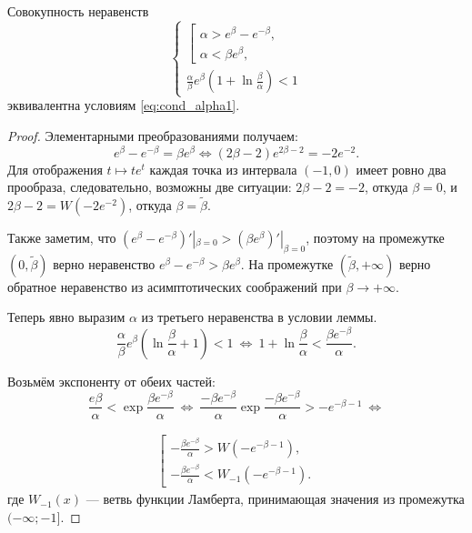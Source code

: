 \begin{lemma}
\label{lm:parameter_constraints:ch1}
Совокупность неравенств 
\[
\begin{cases}
\left[
\begin{array}{ll}
	\alpha > e^{\beta} - e^{-\beta},\\
    \alpha < \beta e^{\beta},
\end{array}
\right.\\
\frac{\alpha}{\beta}e^{\beta}\left(1 + \ln\frac{\beta}{\alpha}\right) < 1
\end{cases}
\]
эквивалентна условиям \eqref{eq:cond_alpha1}.
\end{lemma}
\begin{proof}
Элементарными преобразованиями получаем: 
\[
e^{\beta} - e^{-\beta} = \beta e^{\beta} \Leftrightarrow (2\beta - 2) e^{2\beta - 2} = -2e^{-2}.
\]
Для отображения $t \mapsto te^t$ каждая точка из интервала $(-1, 0)$ имеет ровно два прообраза, следовательно, возможны две ситуации: $2\beta - 2 = -2$, откуда $\beta = 0$, и $2\beta - 2 = W(-2e^{-2})$, откуда $\beta = \tilde{\beta}$.

Также заметим, что $(e^{\beta} - e^{-\beta})'|_{\beta = 0} > (\beta e^{\beta})'|_{\beta = 0}$, поэтому на промежутке $(0, \tilde{\beta})$ верно неравенство $e^{\beta} - e^{-\beta} > \beta e^{\beta}$. На промежутке $(\tilde{\beta}, +\infty)$ верно обратное неравенство из асимптотических соображений при $\beta \to +\infty$.

Теперь явно выразим $\alpha$ из третьего неравенства в условии леммы.
\begin{equation*}
\frac{\alpha}{\beta}e^{\beta}\left(\ln\frac{\beta}{\alpha} + 1\right) < 1\ \Leftrightarrow\ 1 + \ln\dfrac{\beta}{\alpha} < \dfrac{\beta e^{-\beta}}{\alpha}.
\end{equation*}

Возьмём экспоненту от обеих частей:
\begin{equation*}
\dfrac{e\beta}{\alpha} < \exp\dfrac{\beta e^{-\beta}}{\alpha}\ \Leftrightarrow\ \dfrac{-\beta e^{-\beta}}{\alpha}\exp \dfrac{-\beta e^{-\beta}}{\alpha} > -e^{-\beta - 1}\ \Leftrightarrow
\end{equation*}

\begin{align}
\label{eq:step3_cond1_expanded:ch1}
\left[
\begin{array}{ll}
    -\frac{\beta e^{-\beta}}{\alpha} > W(-e^{-\beta - 1}),\\
    -\frac{\beta e^{-\beta}}{\alpha} < W_{-1}(-e^{-\beta - 1}).
\end{array}
\right.
\end{align}
%
где $W_{-1}(x)$ --- ветвь функции Ламберта, принимающая значения из промежутка $(-\infty; -1]$.


\end{proof}
